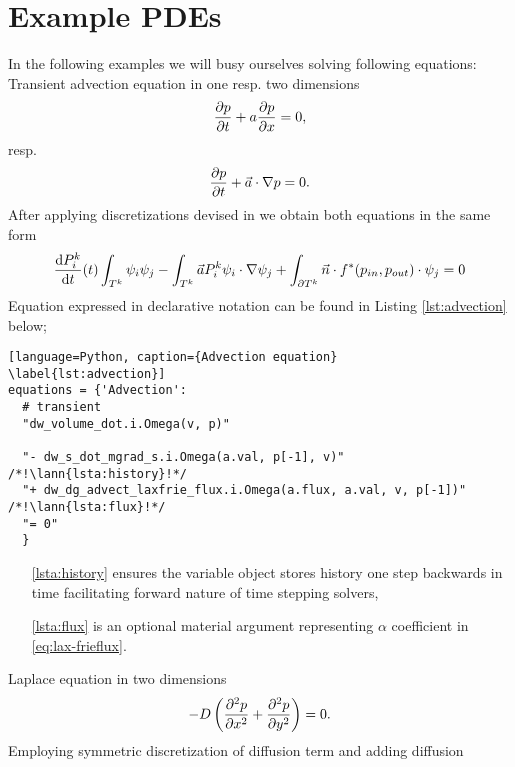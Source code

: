 \section{Example PDEs}
In the following examples we will busy ourselves solving following equations:\\
Transient advection equation in one resp. two dimensions
\begin{equation}
    \label{eq:ex_advection}
    \frac{\partial p}{\partial t} + a\frac{\partial p}{\partial x} = 0,
\end{equation}
resp.
\begin{equation}
    \frac{\partial p}{\partial t} + \vec{a}\cdot\nabla{p} = 0.
\end{equation}
After applying discretizations devised in  we obtain both 
equations in the same form
\begin{equation}
         \frac{\text{d}P^k_i}{\text{d}t}(t)\int_{T^k}\psi_i\psi_j 
         - \int_{T^k} \vec{a}P_i^k\psi_i\cdot\nabla\psi_j 
         + \int_{\partial{T^k}} \vec{n}
        \cdot f^{*} (p_{in}, p_{out})\cdot\psi_j = 0
\end{equation}
Equation expressed in \sfepy{} declarative notation can be found in Listing 
\ref{lst:advection} below;
\setcounter{lstannotation}{0}
\begin{lstlisting}[language=Python, caption={Advection equation}
\label{lst:advection}]
equations = {'Advection': 
  # transient
  "dw_volume_dot.i.Omega(v, p)"
 
  "- dw_s_dot_mgrad_s.i.Omega(a.val, p[-1], v)" /*!\lann{lsta:history}!*/
  "+ dw_dg_advect_laxfrie_flux.i.Omega(a.flux, a.val, v, p[-1])"  /*!\lann{lsta:flux}!*/
  "= 0"
  }
\end{lstlisting}
\begin{itemize}
    \item[\ref{lsta:history}]  ensures the variable object 
    stores history one step backwards in time facilitating forward nature of 
    time stepping solvers,
    \item[\ref{lsta:flux}]  is an optional material argument 
    representing $\alpha$ coefficient in \eqref{eq:lax-frieflux}.
\end{itemize}
Laplace equation in two dimensions
\begin{equation}
    \label{eq:ex_laplace}
    - D \left(\frac{\partial^2 p}{\partial x^2} + \frac{\partial^2 p}{\partial y^2} \right)= 0.
\end{equation}
Employing symmetric discretization of diffusion term and adding diffusion 

